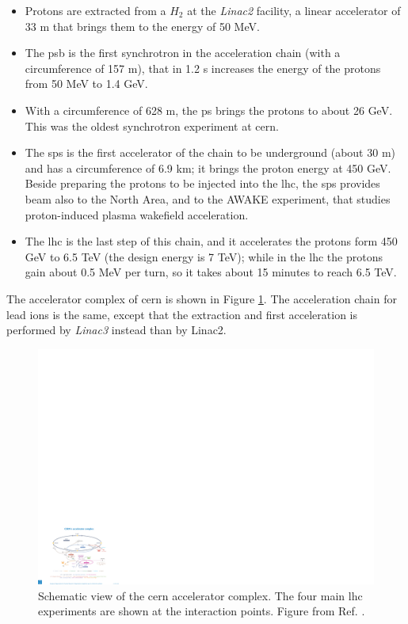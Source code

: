 \begin{itemize}
\item Protons are extracted from a $H_2$ at the \textit{Linac2} facility, a linear accelerator of 33 m that brings them to the energy of 50 MeV.
\item The \gls{psb} is the first synchrotron in the acceleration chain (with a circumference of 157 m), that in 1.2 s increases the energy of the protons from 50 MeV to 1.4 GeV.
\item With a circumference of 628 m, the \gls{ps} brings the protons to about 26 GeV. This was the oldest synchrotron experiment at \gls{cern}.
\item The \gls{sps} is the first accelerator of the chain to be underground (about 30 m) and has a circumference of 6.9 km; it brings the proton energy at 450 GeV. Beside preparing the protons to be injected into the \gls{lhc}, the \gls{sps} provides beam also to the North Area, and to the AWAKE experiment, that studies proton-induced plasma wakefield acceleration.
\item The \gls{lhc} is the last step of this chain, and it accelerates the protons form 450 GeV to 6.5 TeV (the design energy is 7 TeV); while in the \gls{lhc} the protons gain about 0.5 MeV per turn, so it takes about 15 minutes to reach 6.5 TeV.
\end{itemize}

The accelerator complex of \gls{cern} is shown in Figure \ref{fig:lhc:acc}. The acceleration chain for lead ions is the same, except that the extraction and first acceleration is performed by \textit{Linac3} instead than by Linac2.

\begin{figure}[ht]
\centering
\includegraphics[width=1\textwidth]{figures/lhc/acc_complex.pdf}
\caption{ Schematic view of the \gls{cern} accelerator complex. The four main \gls{lhc} experiments are shown at the interaction points. Figure from Ref. \cite{Christiane:1260465}.}
\label{fig:lhc:acc}
\end{figure}


